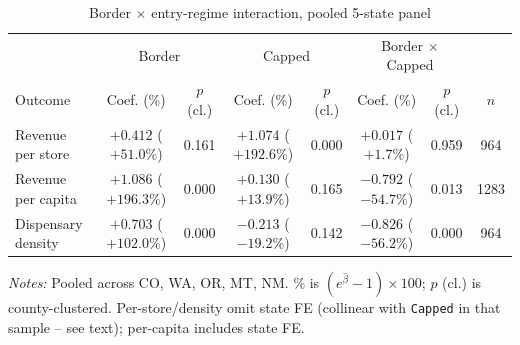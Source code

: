 \begin{table}[htbp]
\centering
\caption{Border $\times$ entry-regime interaction, pooled 5-state panel}
\label{tab:main_pooled}
\small
\begin{tabular}{lccccccc}
\toprule
& \multicolumn{2}{c}{Border} & \multicolumn{2}{c}{Capped} & \multicolumn{2}{c}{Border $\times$ Capped} & \\
Outcome & Coef. (\%) & $p$ (cl.) & Coef. (\%) & $p$ (cl.) & Coef. (\%) & $p$ (cl.) & $n$ \\
\midrule
Revenue per store & $+0.412$ ($+51.0\%$) & 0.161 & $+1.074$ ($+192.6\%$) & 0.000 & $+0.017$ ($+1.7\%$) & 0.959 & 964 \\
Revenue per capita & $+1.086$ ($+196.3\%$) & 0.000 & $+0.130$ ($+13.9\%$) & 0.165 & $-0.792$ ($-54.7\%$) & 0.013 & 1283 \\
Dispensary density & $+0.703$ ($+102.0\%$) & 0.000 & $-0.213$ ($-19.2\%$) & 0.142 & $-0.826$ ($-56.2\%$) & 0.000 & 964 \\
\bottomrule
\end{tabular}
\footnotesize
\vspace{0.2em}

\noindent\textit{Notes:} Pooled across CO, WA, OR, MT, NM. \% is $(e^{\hat\beta}-1)\times 100$; $p$ (cl.) is
county-clustered. Per-store/density omit state FE (collinear with \texttt{Capped} in that sample -- see text);
per-capita includes state FE.
\end{table}
